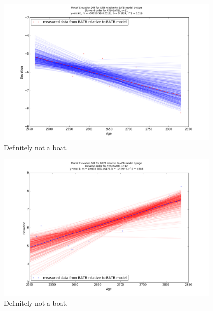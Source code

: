 \documentclass{article}
\begin{document}
\begin{figure}[t]
	\includegraphics[width=\linewidth]{data/gias/theGIA_ATB_relative_to_BATB.png}
	\caption{Definitely not a boat.}
	\label{fig:gias_ATBxBATB}
\end{figure}
\newpage


\begin{figure}[t]
	\includegraphics[width=\linewidth]{data/gias/theGIA_BATB_relative_to_ATB.png}
	\caption{Definitely not a boat.}
	\label{fig:gias_BATBxATB}
\end{figure}
\newpage
\end{document}
